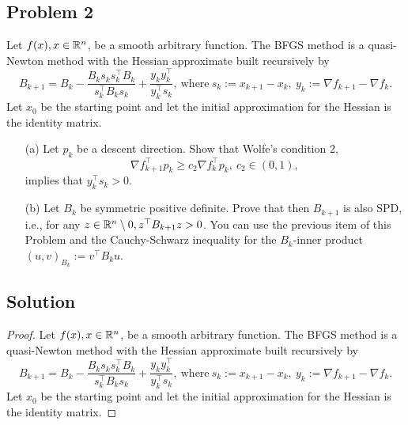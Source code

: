 \documentclass[12pt]{report}
\begin{document}


\begin{problem}%
\subsection*{Problem 2}

Let $f(x), x \in {\mathbb R}^n$, be a smooth arbitrary function. The BFGS method is a quasi-Newton method with the Hessian approximate built recursively by
\[
     B_{k+1} = B_k - \frac{B_ks_ks_k^\top B_k}{s_k^\top B_k s_k} + \frac{y_k y_k^\top}{y_k^\top s_k}, ~\text{where}~ s_k := x_{k+1} - x_k, ~y_k := \nabla f_{k+1} - \nabla f_k.
\]
Let $x_0$ be the starting point and let the initial approximation for the Hessian is the identity matrix.
\begin{enumerate}
    \item [(a)] Let $p_k$ be a descent direction. Show that Wolfe's condition 2,
    \[
         \nabla f_{k+1}^\top p_k \geq c_2 \nabla f_k^\top p_k, ~c_2 \in (0,1),
    \]
    implies that $y_k^\top s_k > 0$.


    \item [(b)] Let $B_k$ be symmetric positive definite. Prove that then $B_{k+1}$ is also SPD, i.e., for any $z \in {\mathbb R}^n\setminus {0}, z^\top B_{k+1}z>0$. You can use the previous item of this Problem and the Cauchy-Schwarz inequality for the $B_k$-inner product $(u,v)_{B_k} := v^\top B_k u$. 
    

\end{enumerate}

\def\n{{\nabla}}

\subsection*{Solution}
\begin{proof}

Let $f(x), x \in {\mathbb R}^n$, be a smooth arbitrary function. The BFGS method is a quasi-Newton method with the Hessian approximate built recursively by
\[
        B_{k+1} = B_k - \frac{B_ks_ks_k^\top B_k}{s_k^\top B_k s_k} + \frac{y_k y_k^\top}{y_k^\top s_k}, ~\text{where}~ s_k := x_{k+1} - x_k, ~y_k := \nabla f_{k+1} - \nabla f_k.
\]
Let $x_0$ be the starting point and let the initial approximation for the Hessian is the identity matrix.


\end{proof}
\end{problem}
\end{document}
